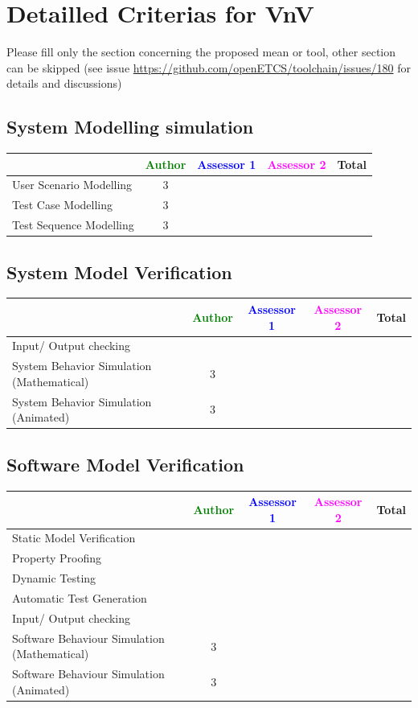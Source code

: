 \section{Detailled Criterias for VnV}

Please  fill only the section concerning the proposed mean or tool, other section can be skipped (see issue \url{https://github.com/openETCS/toolchain/issues/180} for details and discussions)



\subsection{System Modelling simulation}	

\begin{tabular}{|l | c | c | c | c|}
\hline
& \textcolor{green}{Author} & \textcolor{blue}{Assessor 1} & \textcolor{magenta}{Assessor 2} & Total \\
\hline 
User Scenario Modelling &3 & & &  \\
\hline
Test Case Modelling &3 & & &  \\
\hline
Test Sequence Modelling &3 & & &  \\
\hline
\end{tabular}
	
\subsection{System Model Verification}	


\begin{tabular}{|l | c | c | c | c|}
\hline
& \textcolor{green}{Author} & \textcolor{blue}{Assessor 1} & \textcolor{magenta}{Assessor 2} & Total \\
\hline 
Input/ Output checking & & & &  \\
\hline
System Behavior Simulation (Mathematical) &3 & & &  \\
\hline
System Behavior Simulation (Animated) &3 & & &  \\
\hline
\end{tabular}


\subsection{Software Model Verification	}


\begin{tabular}{|l | c | c | c | c|}
\hline
& \textcolor{green}{Author} & \textcolor{blue}{Assessor 1} & \textcolor{magenta}{Assessor 2} & Total \\
\hline 
Static Model Verification & & & &  \\
\hline
Property Proofing & & & &  \\
\hline
Dynamic Testing & & & &  \\
\hline
Automatic Test Generation & & & &  \\
\hline
Input/ Output checking & & & &  \\
\hline
Software Behaviour Simulation (Mathematical) &3 & & &  \\
\hline
Software Behaviour Simulation (Animated) &3 & & &  \\
\hline
\end{tabular}



